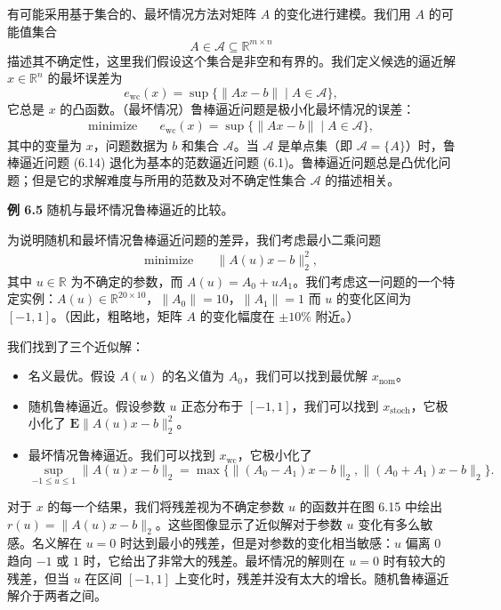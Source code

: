 \documentclass[UTF8,12pt,a4paper,fontset=fandol]{ctexart}
\begin{document}
有可能采用基于集合的、最坏情况方法对矩阵 $A$ 的变化进行建模。我们用 $A$ 的可能值集合
\[
A\in\mathcal{A}\subseteq\mathbb{R}^{m\times n}
\]
描述其不确定性，这里我们假设这个集合是非空和有界的。我们定义候选的逼近解 $x\in\mathbb{R}^n$ 的最坏误差为
\[
e_{\mathrm{wc}}(x)=\sup\{\|Ax-b\|\mid A\in\mathcal{A}\},
\]
它总是 $x$ 的凸函数。（最坏情况）鲁棒逼近问题是极小化最坏情况的误差：
\begin{equation}
\begin{aligned}
\text{minimize}\quad & e_{\mathrm{wc}}(x)=\sup\{\|Ax-b\|\mid A\in\mathcal{A}\},
\end{aligned}
\tag{6.14}
\end{equation}
其中的变量为 $x$，问题数据为 $b$ 和集合 $\mathcal{A}$。当 $\mathcal{A}$ 是单点集（即 $\mathcal{A}=\{A\}$）时，鲁棒逼近问题 (6.14) 退化为基本的范数逼近问题 (6.1)。鲁棒逼近问题总是凸优化问题；但是它的求解难度与所用的范数及对不确定性集合 $\mathcal{A}$ 的描述相关。

\noindent\textbf{例 6.5}\quad
随机与最坏情况鲁棒逼近的比较。

为说明随机和最坏情况鲁棒逼近问题的差异，我们考虑最小二乘问题
\[
\begin{aligned}
\text{minimize}\quad & \|A(u)x-b\|_2^2,
\end{aligned}
\]
其中 $u\in\mathbb{R}$ 为不确定的参数，而 $A(u)=A_0+uA_1$。我们考虑这一问题的一个特定实例：$A(u)\in\mathbb{R}^{20\times 10}$，$\|A_0\|=10$，$\|A_1\|=1$ 而 $u$ 的变化区间为 $[-1,1]$。（因此，粗略地，矩阵 $A$ 的变化幅度在 $\pm 10\%$ 附近。）

我们找到了三个近似解：
\begin{itemize}
\item 名义最优。假设 $A(u)$ 的名义值为 $A_0$，我们可以找到最优解 $x_{\mathrm{nom}}$。
\item 随机鲁棒逼近。假设参数 $u$ 正态分布于 $[-1,1]$，我们可以找到 $x_{\mathrm{stoch}}$，它极小化了 $\mathbf{E}\|A(u)x-b\|_2^2$。
\item 最坏情况鲁棒逼近。我们可以找到 $x_{\mathrm{wc}}$，它极小化了
\[
\sup_{-1\leq u\leq 1}\|A(u)x-b\|_2
=\max\{\|(A_0-A_1)x-b\|_2,\|(A_0+A_1)x-b\|_2\}.
\]
\end{itemize}
对于 $x$ 的每一个结果，我们将残差视为不确定参数 $u$ 的函数并在图 6.15 中绘出 $r(u)=\|A(u)x-b\|_2$。这些图像显示了近似解对于参数 $u$ 变化有多么敏感。名义解在 $u=0$ 时达到最小的残差，但是对参数的变化相当敏感：$u$ 偏离 $0$ 趋向 $-1$ 或 $1$ 时，它给出了非常大的残差。最坏情况的解则在 $u=0$ 时有较大的残差，但当 $u$ 在区间 $[-1,1]$ 上变化时，残差并没有太大的增长。随机鲁棒逼近解介于两者之间。
\end{document}
